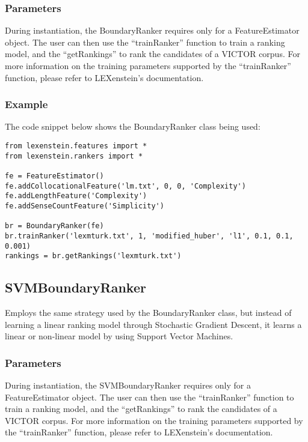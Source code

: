\subsubsection{Parameters}

During instantiation, the BoundaryRanker requires only for a FeatureEstimator object. The user can then use the ``trainRanker'' function to train a ranking model, and the ``getRankings'' to rank the candidates of a VICTOR corpus. For more information on the training parameters supported by the ``trainRanker'' function, please refer to LEXenstein's documentation.

\subsubsection{Example}

The code snippet below shows the BoundaryRanker class being used:

\begin{lstlisting}
from lexenstein.features import *
from lexenstein.rankers import *

fe = FeatureEstimator()
fe.addCollocationalFeature('lm.txt', 0, 0, 'Complexity')
fe.addLengthFeature('Complexity')
fe.addSenseCountFeature('Simplicity')

br = BoundaryRanker(fe)
br.trainRanker('lexmturk.txt', 1, 'modified_huber', 'l1', 0.1, 0.1, 0.001)
rankings = br.getRankings('lexmturk.txt')
\end{lstlisting}















\subsection{SVMBoundaryRanker}

Employs the same strategy used by the BoundaryRanker class, but instead of learning a linear ranking model through Stochastic Gradient Descent, it learns a linear or non-linear model by using Support Vector Machines.

\subsubsection{Parameters}

During instantiation, the SVMBoundaryRanker requires only for a FeatureEstimator object. The user can then use the ``trainRanker'' function to train a ranking model, and the ``getRankings'' to rank the candidates of a VICTOR corpus. For more information on the training parameters supported by the ``trainRanker'' function, please refer to LEXenstein's documentation.

